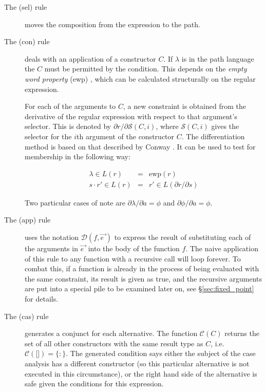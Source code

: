 \documentclass[preprint]{sigplanconf}
\newcommand{\T}[1]{\texttt{#1}}
\newcommand{\D}{\ensuremath{\cdot}} %
\newcommand{\g}[1]{\{#1\}} %
\newcommand{\vecto}[1]{\overrightarrow{#1\;}}
\begin{document}
\begin{description}

\item[The (sel) rule] moves the composition from the expression
to the path.

\item[The (con) rule] deals with an application of a constructor $C$.
If $\lambda$ is in the path language the $C$ must be permitted by
the condition. This depends on the \textit{empty word property}
(ewp) \cite{conway}, which can be calculated structurally on the
regular expression.

For each of the arguments to $C$, a new constraint is obtained from
the derivative of the regular expression with respect to that
argument's selector. This is denoted by $\partial r / \partial
\mathcal{S}(C,i)$, where $\mathcal{S}(C,i)$ gives the selector for
the $i$th argument of the constructor $C$. The differentiation
method is based on that described by Conway \cite{conway}. It can be
used to test for membership in the following way:

\[
\begin{array}{rcl}
\lambda \in L(r) & = & \text{ewp}(r) \\
s\D{}r' \in L(r) & = & r' \in L(\partial r / \partial s)
\end{array}
\]

Two particular cases of note are $\partial \lambda / \partial a =
\phi$ and $\partial \phi / \partial a = \phi$.

\item[The (app) rule] uses the notation $\mathcal{D}(f,\vecto{e})$ to
express the result of substituting each of the arguments in
$\vecto{e}$ into the body of the function $f$. The naive application
of this rule to any function with a recursive call will loop
forever. To combat this, if a function is already in the process of
being evaluated with the same constraint, its result is given as
true, and the recursive arguments are put into a special pile to be
examined later on, see \S\ref{sec:fixed_point} for details.

\item[The (cas) rule] generates a conjunct for each alternative.
The function $\mathcal{C}(C)$ returns the set of all other
constructors with the same result type as $C$, i.e.
$\mathcal{C}(\T{[]}) = \g{:}$. The generated condition says either
the subject of the case analysis has a different constructor (so
this particular alternative is not executed in this circumstance),
or the right hand side of the alternative is safe given the
conditions for this expression.
\end{description}
\end{document}
